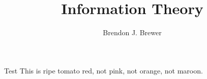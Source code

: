 \documentclass{beamer}
\title{Information Theory}
\author{Brendon J. Brewer}
\begin{document}
\maketitle

\begin{frame}{Test}
This is \alert{ripe tomato red}, not pink, not orange, not maroon.
\end{frame}
\end{document}
